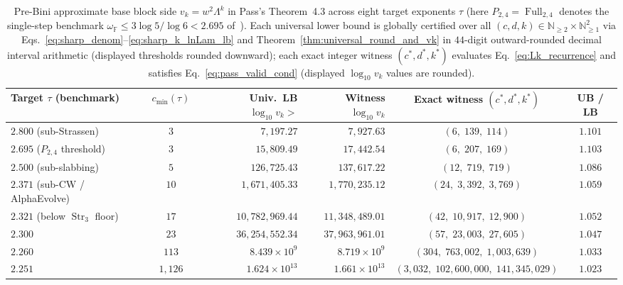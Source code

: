 \documentclass[11pt,a4paper]{article}
\theoremstyle{plain}
\theoremstyle{definition}
\theoremstyle{remark}
\newcommand{\N}{\mathbb{N}}
\newcommand{\F}{\mathbb{F}}
\DeclareMathOperator{\Full}{Full}
\DeclareMathOperator{\Str}{Str}
\begin{document}
\begin{landscape}
\begin{table}[!htbp]
\centering
\small
\caption{Pre-Bini approximate base block side $v_k = w^2 \Lambda^k$ in Pass's Theorem~4.3 across eight target exponents $\tau$ (here $P_{2,4} = \Full_{2,4}$ denotes the single-step benchmark $\omega_{\F} \le 3\log 5/\log 6 < 2.695$ of~\cite{Amanov2026}). Each universal lower bound is globally certified over all $(c, d, k) \in \N_{\ge 2} \times \N_{\ge 1}^2$ via Eqs.~\eqref{eq:sharp_denom}--\eqref{eq:sharp_k_lnLam_lb} and Theorem~\ref{thm:universal_round_and_vk} in $44$-digit outward-rounded decimal interval arithmetic (displayed thresholds rounded downward); each exact integer witness $(c^*, d^*, k^*)$ evaluates Eq.~\eqref{eq:Lk_recurrence} and satisfies Eq.~\eqref{eq:pass_valid_cond} (displayed $\log_{10} v_k$ values are rounded).}
\label{tab:pre_bini_bounds}
\begin{tabular}{@{} l c r r c c @{}}
\toprule
\textbf{Target $\tau$ (benchmark)} & $c_{\min}(\tau)$ & \textbf{Univ.\ LB $\log_{10} v_k >$} & \textbf{Witness $\log_{10} v_k$} & \textbf{Exact witness $(c^*, d^*, k^*)$} & \textbf{UB / LB} \\
\midrule
$2.800$ (sub-Strassen) & $3$ & $7{,}197.27$ & $7{,}927.63$ & $(6,\; 139,\; 114)$ & $1.101$ \\
$2.695$ ($P_{2,4}$ threshold) & $3$ & $15{,}809.49$ & $17{,}442.54$ & $(6,\; 207,\; 169)$ & $1.103$ \\
$2.500$ (sub-slabbing) & $5$ & $126{,}725.43$ & $137{,}617.22$ & $(12,\; 719,\; 719)$ & $1.086$ \\
$2.371$ (sub-CW / AlphaEvolve) & $10$ & $1{,}671{,}405.33$ & $1{,}770{,}235.12$ & $(24,\; 3{,}392,\; 3{,}769)$ & $1.059$ \\
$2.321$ (below $\Str_3$ floor) & $17$ & $10{,}782{,}969.44$ & $11{,}348{,}489.01$ & $(42,\; 10{,}917,\; 12{,}900)$ & $1.052$ \\
$2.300$ & $23$ & $36{,}254{,}552.34$ & $37{,}963{,}961.01$ & $(57,\; 23{,}003,\; 27{,}605)$ & $1.047$ \\
$2.260$ & $113$ & $8.439 \times 10^{9}$ & $8.719 \times 10^{9}$ & $(304,\; 763{,}002,\; 1{,}003{,}639)$ & $1.033$ \\
$2.251$ & $1{,}126$ & $1.624 \times 10^{13}$ & $1.661 \times 10^{13}$ & $(3{,}032,\; 102{,}600{,}000,\; 141{,}345{,}029)$ & $1.023$ \\
\bottomrule
\end{tabular}
\end{table}

\clearpage


\end{landscape}
\end{document}
